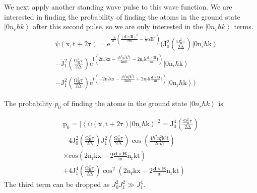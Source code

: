 \documentclass[twocolumn,english,pra,aps,superscriptaddress,floatfix]{revtex4-1}
\begin{document}
We next apply another standing wave pulse to this wave function. We are interested in finding the probability of finding the atoms in the ground state $\left|0n_r\hbar k\right>$ after this second pulse, so we are only interested in the $\left|0n_r\hbar k\right>$ terms.
\begin{eqnarray}
&&\mathrm{\psi(x,t+2\tau)=\mathrm{e^{\frac{-it}{\hbar}\left(\frac{\left(\mathbf{d}\times\mathbf{B}\right)^2}{2m}-\frac{1}{2}\alpha E^2\right)}\bigg(J_0^2\left(\frac{\Omega_R^2\tau}{2\Delta}\right)\left|0n_r\hbar k\right>}}\nonumber \\
&&-\mathrm{J_1^2\left(\frac{\Omega_R^2\tau}{2\Delta}\right)e^{i\left(2n_rkx-\frac{4\hbar^2n_r^2k^2t}{2m\hbar}-2n_rk\frac{\mathbf{d}\times\mathbf{B}}{m}t\right)}\left|0n_r\hbar k\right>}\nonumber \\
&&-\mathrm{J_1^2\left(\frac{\Omega_R^2\tau}{2\Delta}\right)e^{i\left(-2n_rkx-\frac{4\hbar^2n_r^2k^2t}{2m\hbar}+2n_rk\frac{\mathbf{d}\times\mathbf{B}}{m}t\right)}\left|0n_r\hbar k\right>\bigg)}
\end{eqnarray}

The probability $p_0$ of finding the atoms in the ground state $\left|0n_r\hbar k\right>$ is

\begin{eqnarray}
\mathrm{p_0=|\left<\psi(x,t+2\tau)|0n_r\hbar k\right>|^2=J_0^4\left(\frac{\Omega_R^2\tau}{2\Delta}\right)}\nonumber \\
\mathrm{-4J_0^2\left(\frac{\Omega_R^2\tau}{2\Delta}\right)J_1^2\left(\frac{\Omega_R^2\tau}{2\Delta}\right)\cos{\left(\frac{4\hbar^2n_r^2k^2t}{2m\hbar}\right)}}\nonumber \\
\mathrm{\times cos{\left(2n_rkx-2\frac{\mathbf{d}\times\mathbf{B}}{m}n_rkt\right)}} \nonumber \\
\mathrm{+4J_1^4\left(\frac{\Omega_R^2\tau}{2\Delta}\right)\cos^2{\left(2n_rkx-2\frac{\mathbf{d}\times\mathbf{B}}{m}n_rkt\right)}}
\label{prob1}
\end{eqnarray}
The third term can be dropped as $J_0^2J_1^2\gg J_1^4$.  
\end{document}
